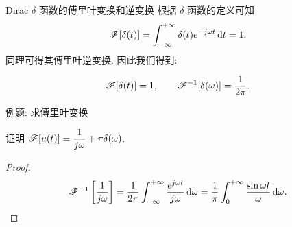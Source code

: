 \begin{frame}{Dirac $\delta$ 函数的傅里叶变换和逆变换}
	\onslide<+->
	根据 $\delta$ 函数的定义可知
	\[\mathscr{F}[\delta(t)]=\int_{-\infty}^{+\infty}\delta(t)e^{-j\omega t}\,\mathrm{d} t=1.\]
	\onslide<+->
	同理可得其傅里叶逆变换.
	\onslide<+->
	因此我们得到:
	\begin{alertblock@}
		\[\mathscr{F}[\delta(t)]=1,\qquad
		\mathscr{F}^{-1}[\delta(\omega)]=\dfrac1{2\pi}.\]
	\end{alertblock@}
\end{frame}


\begin{frame}{例题: 求傅里叶变换}
	\onslide<+->
	\begin{example}
		证明 \alert{$\mathscr{F}[u(t)]=\dfrac1{j\omega}+\pi\delta(\omega)$}.
	\end{example}

	\onslide<+->
	\begin{proof}
			\[\mathscr{F}^{-1}\left[\frac1{j\omega}\right]
			=\frac1{2\pi}\int_{-\infty}^{+\infty}\frac{e^{j\omega t}}{j\omega} \,\mathrm{d}\omega
			=\frac1\pi\int_0^{+\infty}\frac{\sin\omega t}{\omega} \,\mathrm{d}\omega.\]
		\onslide<+->{故
			\[\msf^{-1} \left[\frac1{j\omega}+\pi\delta(\omega)\right]
			=\frac12\sgn(t)+\frac12=u(t)\ (t\neq 0).\qedhere\]
		}
		\vspace{-\baselineskip}
	\end{proof}
\end{frame}
